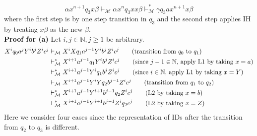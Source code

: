 \documentclass[12pt]{article}
\begin{document}
\begin{equation*}
  \alpha x^{n+1}q_3x\beta \vdash_\mathcal{M} \alpha x^nq_3xx\beta \vdash^*_\mathcal{M} \gamma q_3ax^{n+1}x\beta
\end{equation*}
where the first step is by one step transition in \(q_3\) and the second step applies IH by treating \(x\beta\) as the new \(\beta\).\\
\textbf{Proof for (a)}
Let \(i, j \in \mathbb{N}, j \geq 1\) be arbitrary.
\begin{align}
  X^iq_0a^jY^ib^jZ^ic^j &\vdash_\mathcal{M} X^iXq_1a^{j-1}Y^ib^jZ^ic^j \tag*{(transition from \(q_0\) to \(q_1\))}\\
  & \vdash^{*}_\mathcal{M} X^{i+1}a^{j-1}q_1Y^ib^jZ^ic^j \tag*{(since \(j-1 \in \mathbb{N}\), apply L1 by taking \(x = a\))}\\
  & \vdash^{*}_\mathcal{M} X^{i+1}a^{j-1}Y^iq_1b^jZ^ic^j \tag*{(since \(i \in \mathbb{N}\), apply L1 by taking \(x = Y\))}\\
  & \vdash_\mathcal{M} X^{i+1}a^{j-1}Y^iYq_2b^{j-1}Z^ic^j \tag*{(transition from \(q_1\) to \(q_2\))}\\
  & \vdash^{*}_\mathcal{M} X^{i+1}a^{j-1}Y^{i+1}b^{j-1}q_2Z^ic^j \tag*{(L2 by taking \(x = b\))}\\
  & \vdash^{*}_\mathcal{M} X^{i+1}a^{j-1}Y^{i+1}b^{j-1}Z^iq_2c^j \tag*{(L2 by taking \(x = Z\))}
\end{align}
Here we consider four cases since the representation of IDs after the transition from \(q_2\) to \(q_3\) is different.
\end{document}
